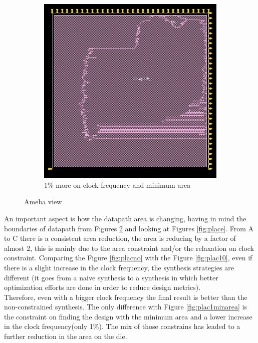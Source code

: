 \begin{figure}[!htbp]
    \begin{subfigure}[b]{0.4\linewidth}
\includegraphics[width=1\linewidth,scale=0.6,angle=0]{../project/physical_design/images_1_minarea/DLX_IR_SIZE32_PC_SIZE32_1_minarea_ameba_prerouting.jpg}
\caption{1\% more on clock frequency and minimum area}
\label{fig:ameba1minarea}
  \end{subfigure}
\caption{Ameba view}
  \label{fig:ameba}
\end{figure}

An important aspect is how the datapath area is changing, having in mind the boundaries of datapath from Figures \ref{fig:ameba} and looking at Figures \ref{fig:place}. From A to C there is a consistent area reduction, the area is reducing by a factor of almost 2, this is mainly due to the area constraint and/or the relaxation on clock constraint. Comparing the Figure \ref{fig:placno} with the Figure \ref{fig:plac10}, even if there is a slight increase in the clock frequency, the synthesis strategies are different (it goes from a naive synthesis to a synthesis in which better optimization efforts are done in order to reduce design metrics). \\Therefore, even with a bigger clock frequency the final result is better than the non-constrained synthesis. The only difference with Figure \ref{fig:plac1minarea} is the constraint on finding the design with the minimum area and a lower increase in the clock frequency(only 1\%). The mix of those constrains has leaded to a further reduction in the area on the die.

